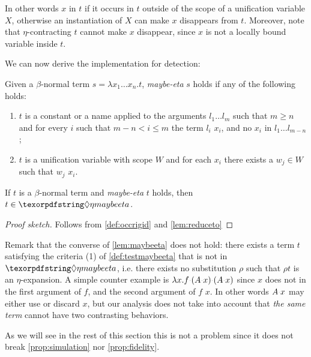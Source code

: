 \documentclass[sigconf,natbib=false,review]{acmart}
\newcommand{\appsep}{\ensuremath{\textcolor{lightgray}{\cdot}}}
\begin{document}
In other words $x$ \occursrigid in $t$ if it occurs in $t$
outside of the scope of a unification variable $X$, otherwise an instantiation
of $X$ can make $x$ disappears from $t$.
Moreover, note that $\eta$-contracting $t$ cannot make $x$ disappear, since
$x$ is not a locally bound variable inside $t$.

We can now derive the implementation for \maybeeta detection:

\newcommand{\testmaybeeta}{\emph{maybe-eta}\xspace}
\begin{definition}[\testmaybeeta]\label{def:testmaybeeta}
  Given a $\beta$-normal term
  $s = \lambda x_1 \ldots x_n.t$, \testmaybeeta{} $s$ holds if any
  of the following holds:
  \begin{enumerate}
    \item $t$ is a constant or a name applied to the arguments
      $l_1 \ldots l_m$ such that 
      $m \geq n$ and for every $i$ such that $m - n < i \leq m$
      the term  $l_i$
      \reduceto{} $x_i$, and
      no $x_i$ \occursrigid{} in $l_1 \ldots l_{m-n}$;
    \item $t$ is a
      unification variable with scope $W$ and
      for each $x_i$ there exists a $w_j \in W$ such that $w_j$
      \reduceto{} $x_i$.
  \end{enumerate}
\end{definition}
\begin{lemma}\label{lem:maybeeta}
  If $t$ is a $\beta$-normal term and \testmaybeeta{} $t$ holds,
  then $t \in \maybeeta$.
\end{lemma}
\begin{proof}[Proof sketch]
Follows from \cref{def:occrigid} and \cref{lem:reduceto}
\end{proof}

\noindent
Remark that the converse of \cref{lem:maybeeta} does not hold: 
there exists a term $t$ satisfying the criteria (1) of
\cref{def:testmaybeeta} that is not in $\maybeeta$, i.e.
there exists no substitution $\rho$ such that $\rho t$ is an
$\eta$-expansion. A simple counter example is
$\lambda x. f \appsep (A \appsep x) \appsep (A \appsep x)$
since $x$ does not \occurrigid{} in the first argument
of $f$,
and the second argument of $f$ \reduceto{} $x$.
In other words $A \appsep x$
may either use or discard $x$, but our analysis does not
take into account that \emph{the same
term} cannot have two contrasting behaviors.

As we will see in the rest of this section this is not a problem
since it does not break
\cref{prop:simulation} nor \cref{prop:fidelity}.
\end{document}
